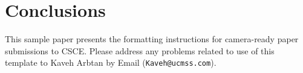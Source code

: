 \documentclass[conference]{csce}
\begin{document}
\section{Conclusions}\label{sec:conclusion}
This sample paper presents the formatting instructions for camera-ready paper 
submissions to CSCE.  Please address any problems related to use of this 
template to Kaveh Arbtan by Email (\texttt{Kaveh@ucmss.com}).

\end{document}
